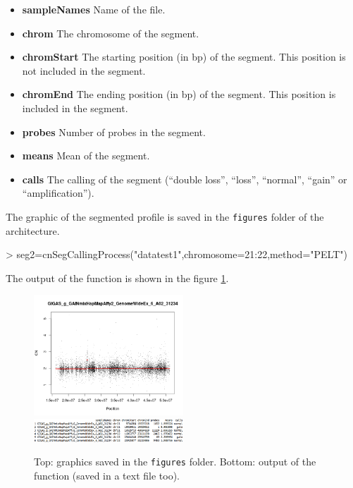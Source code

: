 \documentclass[a4paper,10pt]{article}
\begin{document}
		\begin{itemize}
			\item \textbf{sampleNames} Name of the file.
			\item \textbf{chrom} The chromosome of the segment.
			\item \textbf{chromStart} The starting position (in bp) of the segment. This position is not included in the segment.
			\item \textbf{chromEnd} The ending position (in bp) of the segment. This position is included in the segment.
			\item \textbf{probes} Number of probes in the segment.
			\item \textbf{means} Mean of the segment.
			\item \textbf{calls} The calling of the segment (``double loss'', ``loss'', ``normal'', ``gain'' or ``amplification'').
		\end{itemize}
			
		The graphic of the segmented profile is saved in the \texttt{figures} folder of the architecture.
			
\begin{Schunk}
\begin{Sinput}
> seg2=cnSegCallingProcess("datatest1",chromosome=21:22,method="PELT")
\end{Sinput}
\end{Schunk}
			
		The output of the function is shown in the figure \ref{segcalloutput}.
		\begin{figure}[!h]
			\centering
			\includegraphics[width=0.5\textwidth]{fig/segdata1}
			\includegraphics[width=0.5\textwidth]{fig/callsoutput}
			\caption{Top: graphics saved in the \texttt{figures} folder. Bottom: output of the function (saved in a text file too).}
			\label{segcalloutput}
		\end{figure}
	
\end{document}
